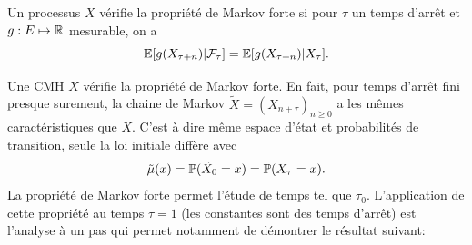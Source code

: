 \begin{definition}\label{def:markov_forte}
Un processus $X$ vérifie la propriété de Markov forte si pour $\tau$ un temps d'arrêt et $g:E\mapsto \mathbb{R}$ mesurable, on a 
$$
\mathbb{E}[g(X_{\tau + n})|\mathcal{F}_\tau]= \mathbb{E}[g(X_{\tau + n})|X_\tau].
$$
\end{definition}
Une CMH $X$ vérifie la propriété de Markov forte. En fait, pour temps d'arrêt fini presque surement, la chaine de Markov $\tilde{X}=(X_{n+\tau})_{n\geq0}$ a les mêmes caractéristiques que $X$. C'est à dire même espace d'état et probabilités de transition, seule la loi initiale diffère avec
$$
\tilde{\mu}(x) = \mathbb{P}(\tilde{X}_0 = x) = \mathbb{P}(X_\tau = x).
$$ 
La propriété de Markov forte permet l'étude de temps tel que $\tau_0$. L'application de cette propriété au temps $\tau = 1$ (les constantes sont des temps d'arrêt) est l'analyse à un pas qui permet notamment de démontrer le résultat suivant:
